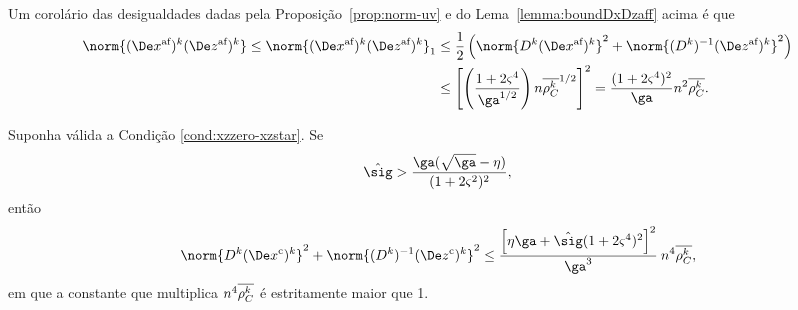Um corolário  das desigualdades dadas pela Proposição~\ref{prop:norm-uv} e do Lema~\ref{lemma:boundDxDzaff} acima é que 
\begin{align}
	\norm{ \dekx  \dekz  } \leq \norm{ \dekx  \dekz  }_{1}   & \leq \frac{1}{2}\left(\norm{\Dk \dekx}^{2} + \norm{\Dik  \dekz  }^{2}\right) \notag
  					\\ 
  					& \leq \left[\left(\frac{1 + 2\bdxzstar^{4} }{\ga^{1/2}}\right)  n\rhoCkb ^{1/2}\right]^{2}
  				= \frac{(1 + 2\bdxzstar^{4})^{2} }{\ga} n^{2}\rhoCkb .
  				 \label{eq:normDxDzaff}
\end{align}

\begin{lema}\label{lemma:boundDxDzc}
Suponha válida a Condição  \ref{cond:xzzero-xzstar}. Se  \begin{equation}
	\label{eq:sig-eta-relation}
	\nextsig > \frac{\ga(\sqrt{\ga} - \eta)}{(1+2\bdxzstar^{2})^{2}},
\end{equation} então  
	\begin{equation}\label{eq:lemma-boundDxDzcx}
		\norm{\Dk\Dekcox}^{2} + \norm{\Dik\Dekcoz}^{2} \leq \dfrac{\left[\eta\ga + \nextsig(1+2\bdxzstar^{4})^{2}\right]^{2}}{\ga^{3}} \: n^{4}\rhoCkb ,
	\end{equation}
	em que a constante que multiplica $n^{4}\overline{\rho_C^{k}}$ é estritamente maior que \num{1}.
\end{lema}



